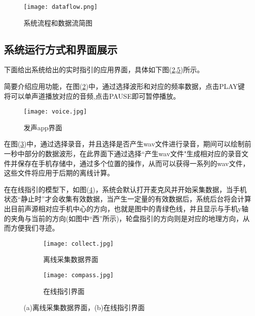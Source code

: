\documentclass[winfonts,oneside]{njuthesis}
\begin{document}
			\begin{figure}[H]
				\centering
				\texttt{[image: dataflow.png]} 
				\caption{{系统流程和数据流简图}}
				\label{fig: dataflow}
			\end{figure}
			
		\subsection{系统运行方式和界面展示}
		
			下面给出系统给出的实时指引的应用界面，具体如下图(\ref{fig: UI1},\ref{fig: UI2})所示。
			
			简要介绍应用功能，在图(\ref{fig: UI1})中，通过选择波形和对应的频率数据，点击PLAY键将可以单声道播放对应的音频,点击PAUSE即可暂停播放。
			
			\begin{figure}[H]
				\centering
				\texttt{[image: voice.jpg]}
				\caption{发声app界面}
				\label{fig: UI1}
			\end{figure}
		
			在图(\ref{fig: UI21})中，通过选择录音，并且选择是否产生wav文件进行录音，期间可以绘制前一秒中部分的数据波形，在此界面下通过选择“产生wav文件"生成相对应的录音文件并保存在手机存储中，通过多个位置的操作，从而可以获得一系列的wav文件，这些文件将应用于后期的离线计算。
			
			在在线指引的模型下，如图(\ref{fig: UI22})，系统会默认打开麦克风并开始采集数据，当手机状态“静止时”才会收集有效数据，当产生一定量的有效数据后，系统后台将会计算出目前声源相对应手机中心的方向，也就是图中的青绿色线，并且显示与手机y轴的夹角与当前的方向(如图中“西”所示)，轮盘指引的方向则是对应的地理方向，从而方便我们寻迹。
			
			
			\begin{figure}[H]
				\centering
				\begin{subfigure}{.45\textwidth}
					\centering
					\texttt{[image: collect.jpg]}
					\caption{离线采集数据界面}
					\label{fig: UI21}
				\end{subfigure}
				\begin{subfigure}{.45\textwidth}
					\centering
					\texttt{[image: compass.jpg]}
					\caption{在线指引界面}
					\label{fig: UI22}
				\end{subfigure}
				\caption{(a)离线采集数据界面，(b)在线指引界面}
				\label{fig: UI2}
			\end{figure}
			
\end{document}

